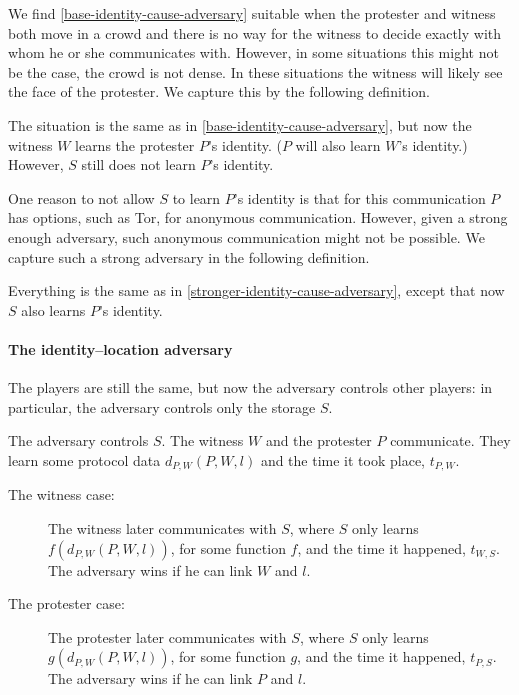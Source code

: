 We find \cref{base-identity-cause-adversary} suitable when the protester and 
witness both move in a crowd and there is no way for the witness to decide 
exactly with whom he or she communicates with.
However, in some situations this might not be the case, \eg the crowd is not 
dense.
In these situations the witness will likely see the face of the protester.
We capture this by the following definition.

\begin{definition}%
  \label{stronger-identity-cause-adversary}
  The situation is the same as in \cref{base-identity-cause-adversary}, but now the 
  witness \(W\) learns the protester \(P\)'s identity.
  (\(P\) will also learn \(W\)'s identity.)
  However, \(S\) still does not learn \(P\)'s identity.
\end{definition}

One reason to not allow \(S\) to learn \(P\)'s identity is that for this 
communication \(P\) has options, such as \ac{Tor}, for anonymous communication.
However, given a strong enough adversary, such anonymous communication might 
not be possible.
We capture such a strong adversary in the following definition.

\begin{definition}%
  \label{strongest-identity-cause-adversary}
  Everything is the same as in \cref{stronger-identity-cause-adversary}, except 
  that now \(S\) also learns \(P\)'s identity.
\end{definition}

\paragraph{The identity--location adversary}

The players are still the same, but now the adversary controls other players: 
in particular, the adversary controls only the storage \(S\).

\begin{definition}%
  \label{base-identity-location-adversary}
  The adversary controls \(S\).
  The witness \(W\) and the protester \(P\) communicate.
  They learn some protocol data \(d_{P,W}(P, W, l)\) and the time it took 
  place, \(t_{P,W}\).
  \begin{description}
    \item[The witness case:]
      The witness later communicates with \(S\), where \(S\) only learns 
      \(f(d_{P,W}(P, W, l))\), for some function \(f\), and the time it 
      happened, \(t_{W,S}\).
      The adversary wins if he can link \(W\) and \(l\).
    \item[The protester case:]
      The protester later communicates with \(S\), where \(S\) only learns 
      \(g(d_{P,W}(P, W, l))\), for some function \(g\), and the time it 
      happened, \(t_{P,S}\).
      The adversary wins if he can link \(P\) and \(l\).
  \end{description}
\end{definition}

